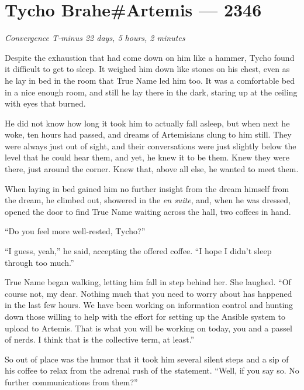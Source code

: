 \hypertarget{tycho-braheartemis-2346}{%
\chapter{Tycho Brahe\#Artemis — 2346}}

\begin{center}
\emph{Convergence T-minus 22 days, 5 hours, 2 minutes}
\end{center}

\noindent Despite the exhaustion that had come down on him like a hammer, Tycho found it difficult to get to sleep. It weighed him down like stones on his chest, even as he lay in bed in the room that True Name led him too. It was a comfortable bed in a nice enough room, and still he lay there in the dark, staring up at the ceiling with eyes that burned.

He did not know how long it took him to actually fall asleep, but when next he woke, ten hours had passed, and dreams of Artemisians clung to him still. They were always just out of sight, and their conversations were just slightly below the level that he could hear them, and yet, he knew it to be them. Knew they were there, just around the corner. Knew that, above all else, he wanted to meet them.

When laying in bed gained him no further insight from the dream himself from the dream, he climbed out, showered in the \emph{en suite}, and, when he was dressed, opened the door to find True Name waiting across the hall, two coffees in hand.

``Do you feel more well-rested, Tycho?''

``I guess, yeah,'' he said, accepting the offered coffee. ``I hope I didn't sleep through too much.''

True Name began walking, letting him fall in step behind her. She laughed. ``Of course not, my dear. Nothing much that you need to worry about has happened in the last few hours. We have been working on information control and hunting down those willing to help with the effort for setting up the Ansible system to upload to Artemis. That is what you will be working on today, you and a passel of nerds. I think that is the collective term, at least.''

So out of place was the humor that it took him several silent steps and a sip of his coffee to relax from the adrenal rush of the statement. ``Well, if you say so. No further communications from them?''

